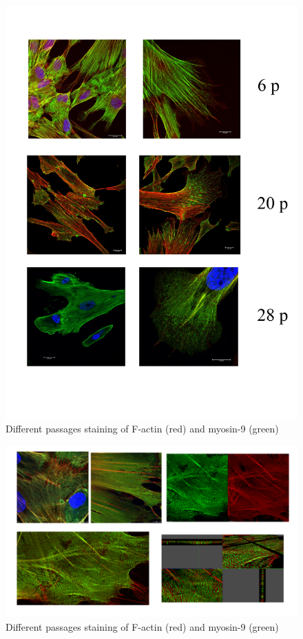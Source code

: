 \documentclass[english,authoryear]{elsarticle}
\begin{document}
\begin{figure}[hbt!]
\centering
\includegraphics[width=0.9\linewidth]{fig1.jpg}
\caption{Different passages staining of F-actin (red) and myosin-9 (green)}
\label{fig:fig1}
\end{figure}

\begin{figure}[hbt!]
\centering
\includegraphics[width=0.9\linewidth]{fig7.png}
\caption{Different passages staining of F-actin (red) and myosin-9 (green)}
\label{fig:fig7}
\end{figure}
\end{document}
